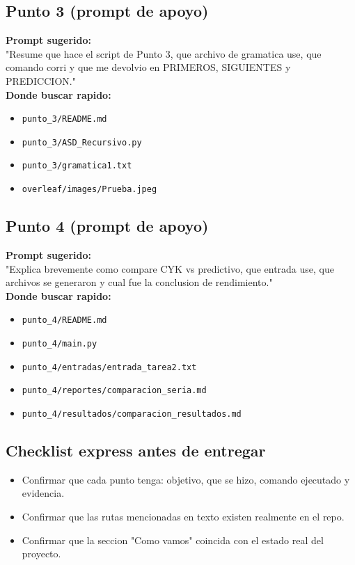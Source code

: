 \documentclass[12pt,a4paper]{article}
\begin{document}
\subsection*{Punto 3 (prompt de apoyo)}
\textbf{Prompt sugerido:} \\
"Resume que hace el script de Punto 3, que archivo de gramatica use, que comando corri y que me devolvio en PRIMEROS, SIGUIENTES y PREDICCION."\\
\textbf{Donde buscar rapido:}
\begin{itemize}
    \item \texttt{punto\_3/README.md}
    \item \texttt{punto\_3/ASD\_Recursivo.py}
    \item \texttt{punto\_3/gramatica1.txt}
    \item \texttt{overleaf/images/Prueba.jpeg}
\end{itemize}

\subsection*{Punto 4 (prompt de apoyo)}
\textbf{Prompt sugerido:} \\
"Explica brevemente como compare CYK vs predictivo, que entrada use, que archivos se generaron y cual fue la conclusion de rendimiento."\\
\textbf{Donde buscar rapido:}
\begin{itemize}
    \item \texttt{punto\_4/README.md}
    \item \texttt{punto\_4/main.py}
    \item \texttt{punto\_4/entradas/entrada\_tarea2.txt}
    \item \texttt{punto\_4/reportes/comparacion\_seria.md}
    \item \texttt{punto\_4/resultados/comparacion\_resultados.md}
\end{itemize}

\subsection*{Checklist express antes de entregar}
\begin{itemize}
    \item Confirmar que cada punto tenga: objetivo, que se hizo, comando ejecutado y evidencia.
    \item Confirmar que las rutas mencionadas en texto existen realmente en el repo.
    \item Confirmar que la seccion "Como vamos" coincida con el estado real del proyecto.
\end{itemize}
\end{document}
